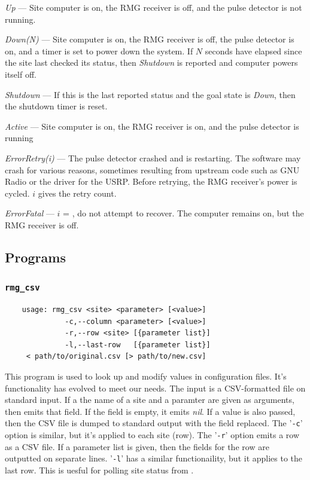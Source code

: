 \documentclass[letter]{article}
\begin{document}
\begin{description}
  \item \textit{Up} --- Site computer is on, the RMG receiver is off, and the pulse detector 
    is not running. 
  \item \textit{Down(N)} --- Site computer is on, the RMG receiver is off, the pulse detector is 
    on, and a timer is set to power down the system. If $N$ seconds have elapsed since the 
    site last checked its status, then \textit{Shutdown} is reported and computer powers itself
    off. 
  \item \textit{Shutdown} --- If this is the last reported status and the goal state is \textit{Down}, 
    then the shutdown timer is reset. 
  \item \textit{Active} --- Site computer is on, the RMG receiver is on, and the pulse detector is
    running 
  \item \textit{ErrorRetry(i)} --- The pulse detector crashed and is restarting. The software 
    may crash for various reasons, sometimes resulting from upstream code such as GNU Radio
    or the driver for the USRP. Before retrying, the RMG receiver's power is cycled. $i$ gives
    the retry count. 
  \item \textit{ErrorFatal} --- $i$ = , do not attempt to recover. The computer
    remains on, but the RMG receiver is off. 
\end{description}


\subsection{Programs}
\subsubsection{\texttt{rmg\_csv}}
\begin{verbatim}
    usage: rmg_csv <site> <parameter> [<value>] 
              -c,--column <parameter> [<value>] 
              -r,--row <site> [{parameter list}]
              -l,--last-row   [{parameter list}]
     < path/to/original.csv [> path/to/new.csv]
\end{verbatim}
This program is used to look up and modify values in configuration files. It's functionality
has evolved to meet our needs. The input is a CSV-formatted file on standard input. If a 
the name of a site and a paramter are given as arguments, then  emits that 
field. If the field is empty, it emits \textit{nil}. If a value is also passed, then 
the CSV file is dumped to standard output with 
the field replaced. The '\texttt{-c}' option is similar, but it's applied to each site (row). 
The '\texttt{-r}' option emits a row as a CSV file. If a parameter list is given, then 
the fields for the row are outputted on separate lines. '\texttt{-l}' has a similar 
functionaility, but it applies to the last row. This is uesful for polling site status
from .
\end{document}
